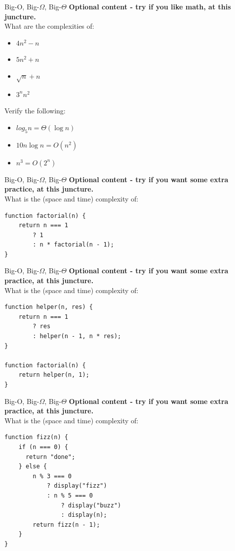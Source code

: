\documentclass[10pt]{beamer}
\begin{document}
\begin{frame}[fragile]{Big-O, Big-$\Omega$, Big-$\Theta$}
\textbf{Optional content - try if you like math, at this juncture.} \\
What are the complexities of:
\begin{itemize}
\item $4n^2 - n$
\item $5n^2 + n$
\item $\sqrt{n} + n$
\item $3^n n^2$
\end{itemize}

Verify the following:
\begin{itemize}
\item $log_5{n} = \Theta(\log{n})$
\item $10n \log{n} = O(n^2)$
\item $n^3 = O(2^n)$
\end{itemize}
\end{frame}

\begin{frame}[fragile]{Big-O, Big-$\Omega$, Big-$\Theta$}
\textbf{Optional content - try if you want some extra practice, at this juncture.} \\
What is the (space and time) complexity of:
\begin{verbatim}
function factorial(n) {
    return n === 1
        ? 1
        : n * factorial(n - 1);
}
\end{verbatim}
\end{frame}

\begin{frame}[fragile]{Big-O, Big-$\Omega$, Big-$\Theta$}
\textbf{Optional content - try if you want some extra practice, at this juncture.} \\
What is the (space and time) complexity of:
\begin{verbatim}
function helper(n, res) {
    return n === 1
        ? res
        : helper(n - 1, n * res);
}

function factorial(n) {
    return helper(n, 1);
}
\end{verbatim}
\end{frame}

\begin{frame}[fragile]{Big-O, Big-$\Omega$, Big-$\Theta$}
\textbf{Optional content - try if you want some extra practice, at this juncture.} \\
What is the (space and time) complexity of:
\begin{verbatim}
function fizz(n) {
    if (n === 0) {
      return "done";
    } else {
        n % 3 === 0
            ? display("fizz")
            : n % 5 === 0
                ? display("buzz")
                : display(n);
        return fizz(n - 1);
    }
}
\end{verbatim}
\end{frame}
\end{document}
